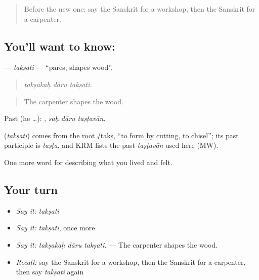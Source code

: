 \label{lesson:SA-C502-taksati}



\begin{quote}
Before the new one: say the Sanskrit for a workshop, then the Sanskrit for a carpenter.
\end{quote}

\subsection*{You'll want to know: }
\textbf{} — \emph{takṣati} — \textquotedblleft{}pares; shapes wood\textquotedblright{}.

\begin{quote}
  
\end{quote}

\begin{quote}
\emph{takṣakaḥ dāru takṣati.}
\end{quote}

\begin{quote}
The carpenter shapes the wood.
\end{quote}

Past (he …):   , \emph{saḥ dāru taṣṭavān}.

\begin{cousinweb}
\textbf{} (\emph{takṣati}) comes from the root √takṣ, \textquotedblleft{}to form by cutting, to chisel\textquotedblright{}; its past participle is \emph{taṣṭa}, and KRM lists the past \emph{taṣṭavān} used here (MW).
\end{cousinweb}

\begin{grammarlens}[title={What you've built}]
One more word for describing what you lived and felt.
\end{grammarlens}

\subsection*{Your turn}
\begin{itemize}
\raggedright
  \item \emph{Say it:} \emph{takṣati}
  \item \emph{Say it:} \emph{takṣati}, once more
  \item \emph{Say it:} \emph{takṣakaḥ dāru takṣati.} — The carpenter shapes the wood.
  \item \emph{Recall:} say the Sanskrit for a workshop, then the Sanskrit for a carpenter, then say \emph{takṣati} again
\end{itemize}

